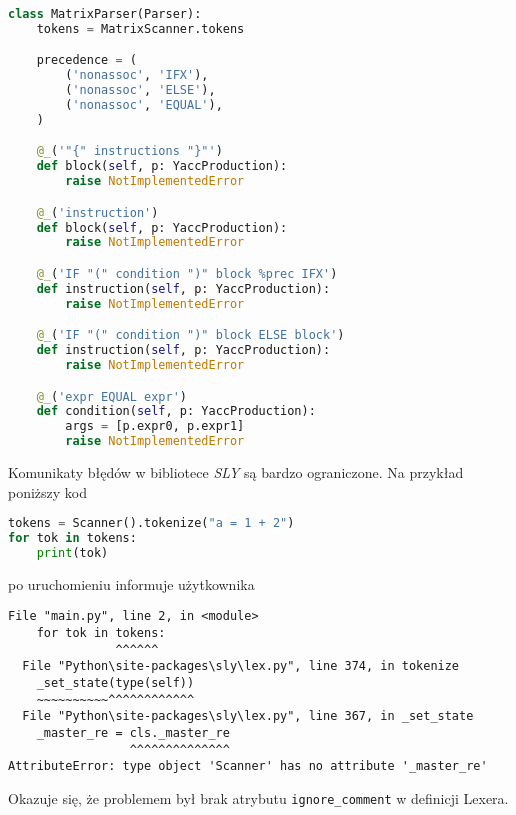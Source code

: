 \begin{lstlisting}[language=Python,float=!htbp,caption={Fragment definicji parsera w Pythonie, wykorzystujacy bibliotekę SLY},label=lst:maximum]
    class MatrixParser(Parser):
    tokens = MatrixScanner.tokens

    precedence = (
        ('nonassoc', 'IFX'),
        ('nonassoc', 'ELSE'),
        ('nonassoc', 'EQUAL'),
    )

    @_('"{" instructions "}"')
    def block(self, p: YaccProduction):
        raise NotImplementedError

    @_('instruction')
    def block(self, p: YaccProduction):
        raise NotImplementedError

    @_('IF "(" condition ")" block %prec IFX')
    def instruction(self, p: YaccProduction):
        raise NotImplementedError

    @_('IF "(" condition ")" block ELSE block')
    def instruction(self, p: YaccProduction):
        raise NotImplementedError

    @_('expr EQUAL expr')
    def condition(self, p: YaccProduction):
        args = [p.expr0, p.expr1]
        raise NotImplementedError

\end{lstlisting}

Komunikaty błędów w bibliotece \textit{SLY} są bardzo ograniczone. Na przykład poniższy kod
\begin{lstlisting}[language=Python,float=!htbp,caption={Fragment niedziałajacego kodu w Pythonie, wykorzystujacy bibliotekę SLY},label=lst:maximum]
tokens = Scanner().tokenize("a = 1 + 2")
for tok in tokens:
    print(tok)

\end{lstlisting}

po uruchomieniu informuje użytkownika
\begin{lstlisting}[language=terminal, caption={Przykład komunikatu błędu w bibliotece \textit{SLY}}]
  File "main.py", line 2, in <module>
    for tok in tokens:
               ^^^^^^
  File "Python\site-packages\sly\lex.py", line 374, in tokenize
    _set_state(type(self))
    ~~~~~~~~~~^^^^^^^^^^^^
  File "Python\site-packages\sly\lex.py", line 367, in _set_state
    _master_re = cls._master_re
                 ^^^^^^^^^^^^^^
AttributeError: type object 'Scanner' has no attribute '_master_re'
\end{lstlisting}

Okazuje się, że problemem był brak atrybutu \verb|ignore_comment| w definicji Lexera.


